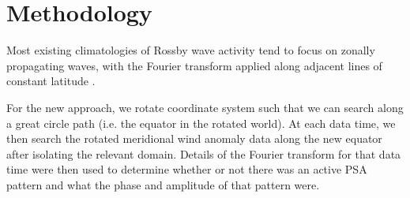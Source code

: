 \section{Methodology}

Most existing climatologies of Rossby wave activity tend to focus on zonally propagating waves, with the Fourier transform applied along adjacent lines of constant latitude \citep[e.g.][]{IrvingSimmonds2015,Glatt2014}.  

For the new approach, we rotate coordinate system such that we can search along a great circle path (i.e. the equator in the rotated world). At each data time, we then search the rotated meridional wind anomaly data along the new equator after isolating the relevant domain. Details of the Fourier transform for that data time were then used to determine whether or not there was an active PSA pattern and what the phase and amplitude of that pattern were.